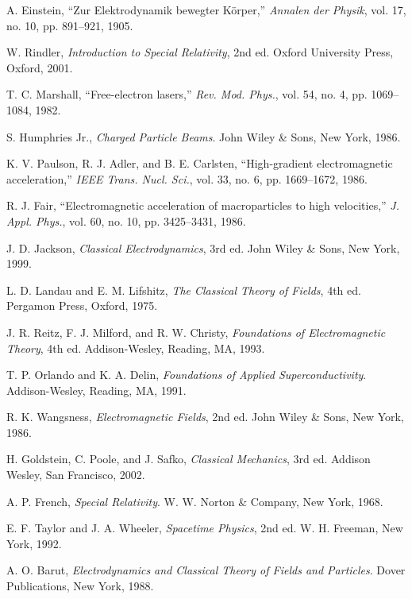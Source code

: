 \documentclass[12pt,a4paper]{article}
\begin{document}
\begin{thebibliography}{99}

 A. Einstein, ``Zur Elektrodynamik bewegter K{\"o}rper,'' \textit{Annalen der Physik}, vol. 17, no. 10, pp. 891--921, 1905.

 W. Rindler, \textit{Introduction to Special Relativity}, 2nd ed. Oxford University Press, Oxford, 2001.

 T. C. Marshall, ``Free-electron lasers,'' \textit{Rev. Mod. Phys.}, vol. 54, no. 4, pp. 1069--1084, 1982.

 S. Humphries Jr., \textit{Charged Particle Beams}. John Wiley \& Sons, New York, 1986.

 K. V. Paulson, R. J. Adler, and B. E. Carlsten, ``High-gradient electromagnetic acceleration,'' \textit{IEEE Trans. Nucl. Sci.}, vol. 33, no. 6, pp. 1669--1672, 1986.

 R. J. Fair, ``Electromagnetic acceleration of macroparticles to high velocities,'' \textit{J. Appl. Phys.}, vol. 60, no. 10, pp. 3425--3431, 1986.

 J. D. Jackson, \textit{Classical Electrodynamics}, 3rd ed. John Wiley \& Sons, New York, 1999.

 L. D. Landau and E. M. Lifshitz, \textit{The Classical Theory of Fields}, 4th ed. Pergamon Press, Oxford, 1975.

 J. R. Reitz, F. J. Milford, and R. W. Christy, \textit{Foundations of Electromagnetic Theory}, 4th ed. Addison-Wesley, Reading, MA, 1993.

 T. P. Orlando and K. A. Delin, \textit{Foundations of Applied Superconductivity}. Addison-Wesley, Reading, MA, 1991.

 R. K. Wangsness, \textit{Electromagnetic Fields}, 2nd ed. John Wiley \& Sons, New York, 1986.

 H. Goldstein, C. Poole, and J. Safko, \textit{Classical Mechanics}, 3rd ed. Addison Wesley, San Francisco, 2002.

 A. P. French, \textit{Special Relativity}. W. W. Norton \& Company, New York, 1968.

 E. F. Taylor and J. A. Wheeler, \textit{Spacetime Physics}, 2nd ed. W. H. Freeman, New York, 1992.

 A. O. Barut, \textit{Electrodynamics and Classical Theory of Fields and Particles}. Dover Publications, New York, 1988.

\end{thebibliography}
\end{document}
